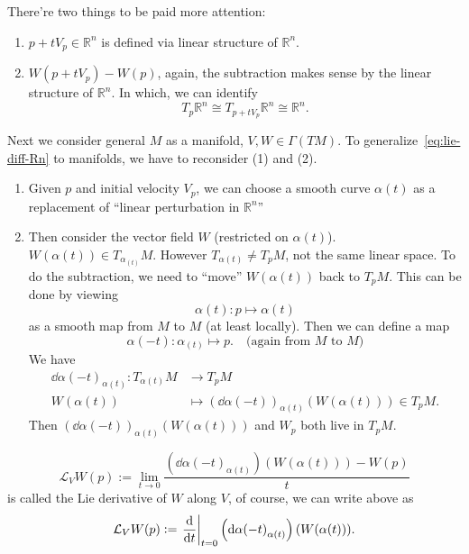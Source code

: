 There're two things to be paid more attention:
\begin{enumerate}[(1)]
    \item \(p+tV_p\in \mathbb{R}^n\) is defined via linear structure of
        \(\mathbb{R}^n\).
    \item \(W(p+tV_p)-W(p)\), again, the subtraction makes sense by the linear
        structure of \(\mathbb{R}^n\). In which, we can identify \[
            T_p \mathbb{R}^n\cong T_{p+tV_p}\mathbb{R}^n\cong \mathbb{R}^n
        .\] 
\end{enumerate}

Next we consider general \(M\) as a manifold, \(V,W\in \Gamma(TM)\). To
generalize~\cref{eq:lie-diff-Rn} to manifolds, we have to reconsider (1) and
(2).
\begin{enumerate}[(1)]
    \item Given \(p\) and initial velocity \(V_p\), we can choose a smooth
    curve \(\alpha(t)\) as a replacement of ``linear perturbation in
    \(\mathbb{R}^n\)''
    \item Then consider the vector field \(W\) (restricted on \(\alpha(t)\)).
    \ie\ \(W(\alpha(t))\in T_{\alpha_(t)}M\). However \(T_{\alpha(t)}\neq
    T_pM\), not the same linear space. To do the subtraction, we need to
    ``move'' \(W(\alpha(t))\) back to \(T_pM\). This can be done by viewing \[
        \alpha(t)\colon p \mapsto \alpha(t)
    \] as a smooth map from \(M\) to \(M\) (at least locally). Then we can
    define a map \[
        \alpha(-t)\colon \alpha_(t) \mapsto p.
        \quad\text{(again from }M\text{ to }M\text{)}
    \] We have
    \begin{align*}
        \dd{\alpha(-t)}_{\alpha(t)}\colon T_{\alpha(t)}M &\longrightarrow
        T_p M \\
        W(\alpha(t)) &\longmapsto \left(\dd{\alpha(-t)}\right)_{\alpha(t)}
        (W(\alpha(t)))\in T_p M
    .\end{align*}
    Then \(\left(\dd{\alpha(-t)}\right)_{\alpha(t)}(W(\alpha(t)))\) and \(W_p\)
    both live in \(T_p M\).
\end{enumerate}

\begin{definition} \[
    \mathcal{L}_V W(p):=\lim_{t \to 0} \frac{\left(\dd{\alpha(-t)}_{\alpha(t)}
    \right)(W(\alpha(t)))-W(p)}{t}
\] is called the Lie derivative of \(W\) along \(V\), of course, we can write
above as \[
    \mathcal{L}_V W(p):=\eval{\dv{t}}_{t=0}
    \left(\dd{\alpha(-t)}_{\alpha(t)}\right)(W(\alpha(t)))
.\] 
\end{definition}

